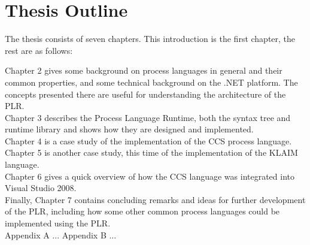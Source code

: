 \section{Thesis Outline}

The thesis consists of seven chapters. This introduction is the first chapter, the rest are as follows:

Chapter 2 gives some background on process languages in general and their common properties, and some technical background on the .NET platform. The concepts presented there are useful for understanding the architecture of the PLR.\\
Chapter 3 describes the Process Language Runtime, both the syntax tree and runtime library and shows how they are designed and implemented. \\
Chapter 4 is a case study of the implementation of the CCS process language.\\
Chapter 5 is another case study, this time of the implementation of the KLAIM language.\\
Chapter 6 gives a quick overview of how the CCS language was integrated into Visual Studio 2008. \\
Finally, Chapter 7 contains concluding remarks and ideas for further development of the PLR, including how some other common process languages could be implemented using the PLR.\\

Appendix A ...
Appendix B ...